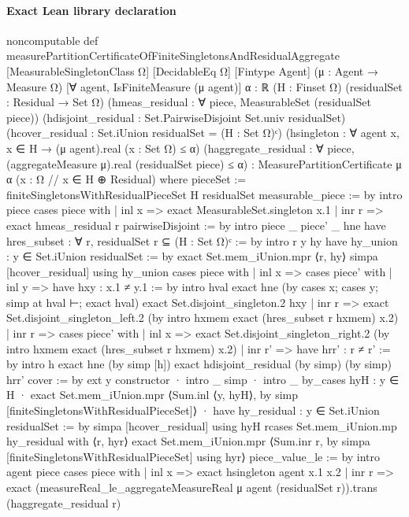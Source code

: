 \documentclass[10pt]{article}
\begin{document}
\paragraph{Exact Lean library declaration}
\begin{ReviewVerbatim}
noncomputable def measurePartitionCertificateOfFiniteSingletonsAndResidualAggregate
    [MeasurableSingletonClass Ω] [DecidableEq Ω]
    [Fintype Agent] (μ : Agent → Measure Ω)
    [∀ agent, IsFiniteMeasure (μ agent)]
    {α : ℝ} (H : Finset Ω) (residualSet : Residual → Set Ω)
    (hmeas_residual : ∀ piece, MeasurableSet (residualSet piece))
    (hdisjoint_residual : Set.PairwiseDisjoint Set.univ residualSet)
    (hcover_residual : Set.iUnion residualSet = (H : Set Ω)ᶜ)
    (hsingleton : ∀ agent x, x ∈ H → (μ agent).real ({x} : Set Ω) ≤ α)
    (haggregate_residual :
      ∀ piece, (aggregateMeasure μ).real (residualSet piece) ≤ α) :
    MeasurePartitionCertificate μ α ({x : Ω // x ∈ H} ⊕ Residual) where
  pieceSet := finiteSingletonsWithResidualPieceSet H residualSet
  measurable_piece := by
    intro piece
    cases piece with
    | inl x => exact MeasurableSet.singleton x.1
    | inr r => exact hmeas_residual r
  pairwiseDisjoint := by
    intro piece _ piece' _ hne
    have hres_subset : ∀ r, residualSet r ⊆ (H : Set Ω)ᶜ := by
      intro r y hy
      have hy_union : y ∈ Set.iUnion residualSet := by
        exact Set.mem_iUnion.mpr ⟨r, hy⟩
      simpa [hcover_residual] using hy_union
    cases piece with
    | inl x =>
        cases piece' with
        | inl y =>
            have hxy : x.1 ≠ y.1 := by
              intro hval
              exact hne (by cases x; cases y; simp at hval ⊢; exact hval)
            exact Set.disjoint_singleton.2 hxy
        | inr r =>
            exact Set.disjoint_singleton_left.2
              (by
                intro hxmem
                exact (hres_subset r hxmem) x.2)
    | inr r =>
        cases piece' with
        | inl x =>
            exact Set.disjoint_singleton_right.2
              (by
                intro hxmem
                exact (hres_subset r hxmem) x.2)
        | inr r' =>
            have hrr' : r ≠ r' := by
              intro h
              exact hne (by simp [h])
            exact hdisjoint_residual (by simp) (by simp) hrr'
  cover := by
    ext y
    constructor
    · intro _
      simp
    · intro _
      by_cases hyH : y ∈ H
      · exact Set.mem_iUnion.mpr
          ⟨Sum.inl ⟨y, hyH⟩, by simp [finiteSingletonsWithResidualPieceSet]⟩
      · have hy_residual : y ∈ Set.iUnion residualSet := by
          simpa [hcover_residual] using hyH
        rcases Set.mem_iUnion.mp hy_residual with ⟨r, hyr⟩
        exact Set.mem_iUnion.mpr
          ⟨Sum.inr r, by simpa [finiteSingletonsWithResidualPieceSet] using hyr⟩
  piece_value_le := by
    intro agent piece
    cases piece with
    | inl x => exact hsingleton agent x.1 x.2
    | inr r =>
        exact (measureReal_le_aggregateMeasureReal μ agent (residualSet r)).trans
          (haggregate_residual r)
\end{ReviewVerbatim}
\end{document}
